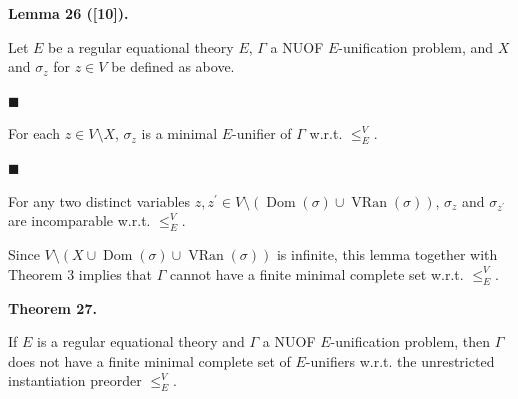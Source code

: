 \documentclass[10pt,a4paper]{amsart}
\begin{document}
 
 
\par\medskip\noindent\textbf{Lemma 26 ([10]).}\par
 
 
Let $E$ be a regular equational theory $E$, $\Gamma$ a NUOF $E$-unification problem, and $X$ and $\sigma_{z}$ for $z\in V$ be defined as above.\par
  
\par\noindent  $\blacksquare$ 
 
For each $z\in V\setminus X$, $\sigma_{z}$ is a minimal $E$-unifier of $\Gamma$ w.r.t. $\leq_{E}^{V}$.\par
 
 
 
\par\noindent  $\blacksquare$ 
 
For any two distinct variables $z,z^{\prime}\in V\setminus(\operatorname{Dom}(\sigma)\cup\operatorname{VRan}(%
\sigma))$, $\sigma_{z}$ and $\sigma_{z^{\prime}}$ are incomparable w.r.t. $\leq_{E}^{V}$.\par
 
 
  
 
 
 
Since $V\setminus(X\cup\operatorname{Dom}(\sigma)\cup\operatorname{VRan}(\sigma))$ is infinite, this lemma together with Theorem 3 implies that $\Gamma$ cannot have a finite minimal complete set w.r.t. $\leq_{E}^{V}$.\par
 
 
 
\par\medskip\noindent\textbf{Theorem 27.}\par
 
 
If $E$ is a regular equational theory and $\Gamma$ a NUOF $E$-unification problem, then $\Gamma$ does not have a finite minimal complete set of $E$-unifiers w.r.t. the unrestricted instantiation preorder $\leq_{E}^{V}$.\par
 
\end{document}
